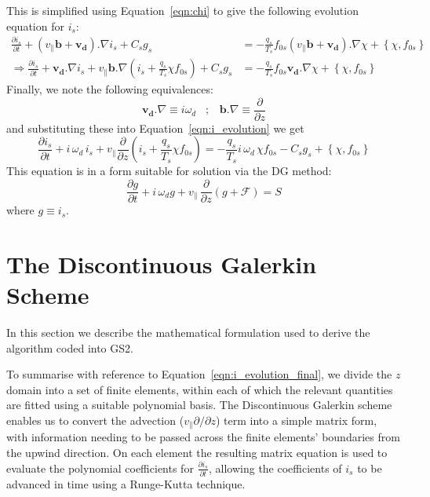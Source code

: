 \documentclass[10pt,a4paper]{article}
\newcommand{\dd}{\partial}
\begin{document}
This is simplified using Equation~\ref{eqn:chi} to give the following
evolution equation for $i_s$:
\begin{align}
  \frac{\dd i_s}{\dd t} + (v_\parallel \mathbf{b} + \mathbf{v_d}).\nabla i_s +
  C_s g_s & = - \frac{q_s}{T_s} f_{0s} (v_\parallel \mathbf{b} +
  \mathbf{v_d}).\nabla \chi + \left\{ \chi, f_{0s}\right\}
  \nonumber \\
  \Longrightarrow \frac{\dd i_s}{\dd t} + \mathbf{v_d}.\nabla i_s + v_\parallel
  \mathbf{b}.\nabla \left(i_s + \frac{q_s}{T_s} \chi f_{0s} \right) + C_s g_s
  & = - \frac{q_s}{T_s} f_{0s} \mathbf{v_d}.\nabla \chi + \left\{ \chi, f_{0s}\right\}
  \label{eqn:i_evolution} 
\end{align}
Finally, we note the following equivalences:
\[
\mathbf{v_d}.\nabla  \equiv i \omega_d \;\;\; ; \;\;\;
\mathbf{b}.\nabla \equiv \frac{\dd}{\dd z}
\]
and substituting these into Equation~\ref{eqn:i_evolution} we get
\begin{equation}
\boxed{
  \frac{\dd i_s}{\dd t} + i\,\omega_d\,i_s + v_\parallel \frac{\dd}{\dd z} \left(
    i_s + \frac{q_s}{T_s} \chi f_{0s} \right) = - \frac{q_s}{T_s} i\,\omega_d\,
  \chi f_{0s} - C_s g_s + \left\{ \chi, f_{0s}\right\}
\label{eqn:i_evolution_final}
}
\end{equation}
This equation is in a form suitable for solution via the DG method:
\begin{equation}
\frac{\dd g}{\dd t} + i\,\omega_d g + v_\parallel\, \frac{\dd}{\dd z}(g+\mathcal{F}) = S
\label{eqn:gs2form4dg}
\end{equation}
where $g \equiv i_s$.

\newpage
\section{The Discontinuous Galerkin Scheme}
\label{sec:dgscheme}

In this section we describe the mathematical formulation used to derive the
algorithm coded into GS2.

To summarise with reference to Equation~\ref{eqn:i_evolution_final}, we divide
the $z$ domain into a set of finite elements, within each of which the
relevant quantities are fitted using a suitable polynomial basis. The
Discontinuous Galerkin scheme enables us to convert the advection
($v_\parallel \dd/\dd z$) term into a simple matrix form, with information
needing to be passed across the finite elements' boundaries from the upwind
direction. On each element the resulting matrix equation is used to evaluate
the polynomial coefficients for $\frac{\dd i_s}{\dd t}$, allowing the
coefficients of $i_s$ to be advanced in time using a Runge-Kutta technique.
\end{document}
